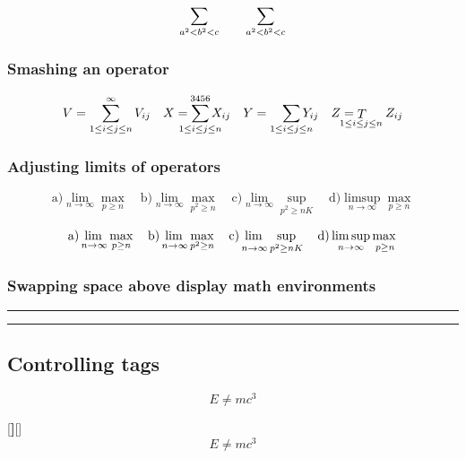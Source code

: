 \documentclass{article}
\begin{document}
\begingroup \fontsize{24}{\baselineskip}\selectfont
\[
  \sum_{\crampedsubstack{a^2<b^2<c}}\qquad
  \sum_{a^2<b^2<c}
\]
\endgroup

\subsubsection{Smashing an operator}
\[
  V = \sum_{1\le i\le j\le n}^{\infty} V_{ij}                  \quad
  X = \smashoperator{\sum_{1\le i\le j\le n}^{3456}} X_{ij}    \quad
  Y = \smashoperator[r]{\sum\limits_{1\le i\le j\le n}} Y_{ij} \quad
  Z = \smashoperator[l]{\mathop{T}_{1\le i\le j\le n}} Z_{ij}
\]

\subsubsection{Adjusting limits of operators}

\[
  \text{a)} \lim_{n\to\infty} \max_{p\ge n} \quad
  \text{b)} \lim_{n\to\infty} \max_{p^2\ge n} \quad
  \text{c)} \lim_{n\to\infty} \sup_{p^2\ge nK} \quad
  \text{d)} \limsup_{n\to\infty} \max_{p\ge n}
\]

\[
  \text{a)} \adjustlimits\lim_{n\to\infty} \max_{p\ge n} \quad
  \text{b)} \adjustlimits\lim_{n\to\infty} \max_{p^2\ge n} \quad
  \text{c)} \adjustlimits\lim_{n\to\infty} \sup_{p^2\ge nK} \quad
  \text{d)} \adjustlimits\limsup_{n\to\infty} \max_{p\ge n}
\]


\subsubsection{Swapping space above \texorpdfstring{\AmS}{AMS} display math environments }

\noindent\rule\textwidth{1pt}
\begin{align*}  A &= B \end{align*}
\noindent\rule\textwidth{1pt}
\begin{align*}
\SwapAboveDisplaySkip
A &= B
\end{align*}

\subsection{Controlling tags}

  \begin{equation}
    E \neq m c^3
  \end{equation}

[\textbf]{[}{]}
\begin{equation}
  E \neq m c^3
\end{equation}
\end{document}
